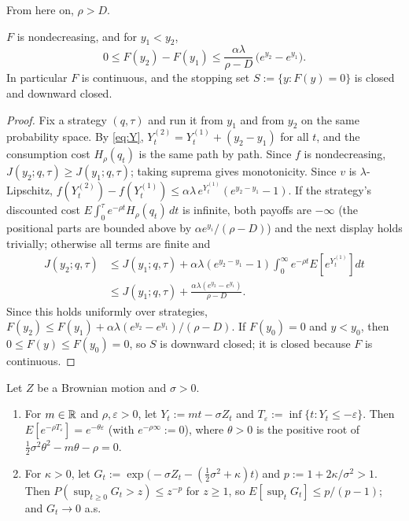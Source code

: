 \noindent From here on, $\rho>D$.

\begin{alemma}\label{lem:mono}
$F$ is nondecreasing, and for $y_1<y_2$,
\[
0\le F(y_2)-F(y_1)\le \frac{\alpha\lambda}{\rho-D}\,\big(e^{y_2}-e^{y_1}\big).
\]
In particular $F$ is continuous, and the stopping set $S:=\{y:F(y)=0\}$ is closed and downward closed.
\end{alemma}

\begin{proof}
Fix a strategy $(q,\tau)$ and run it from $y_1$ and from $y_2$ on the same probability space. By \eqref{eq:Y}, $Y^{(2)}_t=Y^{(1)}_t+(y_2-y_1)$ for all $t$, and the consumption cost $H_\rho(q_t)$ is the same path by path. Since $f$ is nondecreasing, $J(y_2;q,\tau)\ge J(y_1;q,\tau)$; taking suprema gives monotonicity. Since $v$ is $\lambda$-Lipschitz, $f(Y^{(2)}_t)-f(Y^{(1)}_t)\le\alpha\lambda\,e^{Y^{(1)}_t}(e^{y_2-y_1}-1)$. If the strategy's discounted cost $E\int_0^\tau e^{-\rho t}H_\rho(q_t)\,dt$ is infinite, both payoffs are $-\infty$ (the positional parts are bounded above by $\alpha e^{y_i}/(\rho-D)$) and the next display holds trivially; otherwise all terms are finite and
\begin{align*}
J(y_2;q,\tau)&\le J(y_1;q,\tau)+\alpha\lambda(e^{y_2-y_1}-1)\int_0^\infty e^{-\rho t}E[e^{Y^{(1)}_t}]dt\\
&\le J(y_1;q,\tau)+\frac{\alpha\lambda(e^{y_2}-e^{y_1})}{\rho-D}.
\end{align*}
Since this holds uniformly over strategies, $F(y_2)\le F(y_1)+\alpha\lambda(e^{y_2}-e^{y_1})/(\rho-D)$. If $F(y_0)=0$ and $y<y_0$, then $0\le F(y)\le F(y_0)=0$, so $S$ is downward closed; it is closed because $F$ is continuous.
\end{proof}

\begin{alemma}\label{lem:bm}
Let $Z$ be a Brownian motion and $\sigma>0$.
\begin{enumerate}
\item[(a)] For $m\in\mathbb{R}$ and $\rho,\varepsilon>0$, let $Y_t:=mt-\sigma Z_t$ and $T_\varepsilon:=\inf\{t:Y_t\le-\varepsilon\}$. Then $E[e^{-\rho T_\varepsilon}]=e^{-\theta\varepsilon}$ (with $e^{-\rho\infty}:=0$), where $\theta>0$ is the positive root of $\tfrac12\sigma^2\theta^2-m\theta-\rho=0$.
\item[(b)] For $\kappa>0$, let $G_t:=\exp\big(-\sigma Z_t-(\tfrac12\sigma^2+\kappa)t\big)$ and $p:=1+2\kappa/\sigma^2>1$. Then $P(\sup_{t\ge0}G_t>z)\le z^{-p}$ for $z\ge1$, so $E[\sup_tG_t]\le p/(p-1)$; and $G_t\to0$ a.s.
\end{enumerate}
\end{alemma}

